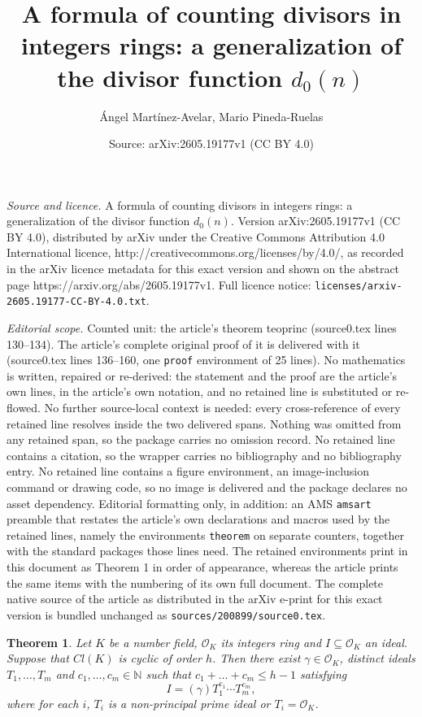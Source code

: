 \documentclass[10pt,a4paper]{amsart}
\title{A formula of counting divisors in integers rings: a generalization of the divisor function $d_0(n)$}
\author{\'Angel Mart\'inez-Avelar, Mario Pineda-Ruelas}
\date{Source: arXiv:2605.19177v1 (CC BY 4.0)}
\newtheorem{theorem}{Theorem}
\begin{document}
\maketitle

\noindent\emph{Source and licence.} A formula of counting divisors in integers rings: a generalization of the divisor function $d_0(n)$. Version arXiv:2605.19177v1 (CC BY 4.0), distributed by arXiv under the Creative Commons Attribution 4.0 International licence, http://creativecommons.org/licenses/by/4.0/, as recorded in the arXiv licence metadata for this exact version and shown on the abstract page https://arxiv.org/abs/2605.19177v1. Full licence notice: \texttt{licenses/arxiv-2605.19177-CC-BY-4.0.txt}.\par\smallskip

\noindent\textit{Editorial scope.} Counted unit: the article's theorem teoprinc (source0.tex lines 130--134). The article's complete original proof of it is delivered with it (source0.tex lines 136--160, one \texttt{proof} environment of 25 lines). No mathematics is written, repaired or re-derived: the statement and the proof are the article's own lines, in the article's own notation, and no retained line is substituted or re-flowed.  No further source-local context is needed: every cross-reference of every retained line resolves inside the two delivered spans.  Nothing was omitted from any retained span, so the package carries no omission record.  No retained line contains a citation, so the wrapper carries no bibliography and no bibliography entry.  No retained line contains a figure environment, an image-inclusion command or drawing code, so no image is delivered and the package declares no asset dependency.  Editorial formatting only, in addition: an AMS \texttt{amsart} preamble that restates the article's own declarations and macros used by the retained lines, namely the environments \texttt{theorem} on separate counters, together with the standard packages those lines need.  The retained environments print in this document as Theorem 1 in order of appearance, whereas the article prints the same items with the numbering of its own full document.  The complete native source of the article as distributed in the arXiv e-print for this exact version is bundled unchanged as \texttt{sources/200899/source0.tex}.
\begin{theorem}\label{teoprinc}
Let $K$ be a number field, $\mathcal{O}_K$ its integers ring and $I \subseteq \mathcal{O}_K$ an ideal. Suppose that $Cl(K)$ is cyclic of order $h$. Then there exist $\gamma \in \mathcal{O}_K$, distinct ideals $T_1, \dots, T_{m}$ and $c_1,\ldots,c_m\in\mathbb{N}$ such that $c_1+\ldots+c_m\leq h-1$ satisfying
\[ I = (\gamma) T_1^{c_1} \cdots T_{m}^{c_m}, \]
where for each $i$, $T_i$ is a non-principal prime ideal or $T_i=\mathcal{O}_K$.
\end{theorem}
\end{document}
